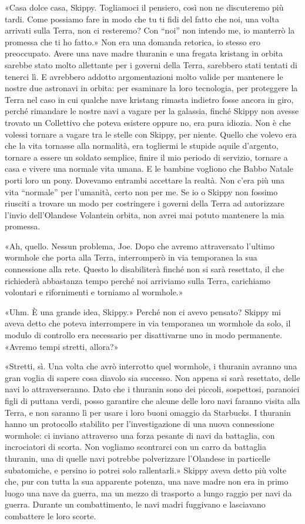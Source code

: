 «Casa dolce casa, Skippy. Togliamoci il pensiero, così non ne
discuteremo più tardi. Come possiamo fare in modo che tu ti fidi del
fatto che noi, una volta arrivati sulla Terra, non ci resteremo? Con
``noi'' non intendo me, io manterrò la promessa che ti ho fatto.» Non
era una domanda retorica, io stesso ero preoccupato. Avere una nave
madre thuranin e una fregata kristang in orbita sarebbe stato molto
allettante per i governi della Terra, sarebbero stati tentati di tenerci
lì. E avrebbero addotto argomentazioni molto valide per mantenere le
nostre due astronavi in orbita: per esaminare la loro tecnologia, per
proteggere la Terra nel caso in cui qualche nave kristang rimasta
indietro fosse ancora in giro, perché rimandare le nostre navi a vagare
per la galassia, finché Skippy non avesse trovato un Collettivo che
poteva esistere oppure no, era pura idiozia. Non è che volessi tornare a
vagare tra le stelle con Skippy, per niente. Quello che volevo era che
la vita tornasse alla normalità, era togliermi le stupide aquile
d'argento, tornare a essere un soldato semplice, finire il mio periodo
di servizio, tornare a casa e vivere una normale vita umana. E le
bambine vogliono che Babbo Natale porti loro un pony. Dovevamo entrambi
accettare la realtà. Non c'era più una vita ``normale'' per l'umanità,
certo non per me. Se io o Skippy non fossimo riusciti a trovare un modo
per costringere i governi della Terra ad autorizzare l'invio
dell'Olandese Volantein orbita, non avrei mai potuto mantenere la mia
promessa.

«Ah, quello. Nessun problema, Joe. Dopo che avremo attraversato l'ultimo
wormhole che porta alla Terra, interromperò in via temporanea la sua
connessione alla rete. Questo lo disabiliterà finché non si sarà
resettato, il che richiederà abbastanza tempo perché noi arriviamo sulla
Terra, carichiamo volontari e rifornimenti e torniamo al wormhole.»

«Uhm. È una grande idea, Skippy.» Perché non ci avevo pensato? Skippy mi
aveva detto che poteva interrompere in via temporanea un wormhole da
solo, il modulo di controllo era necessario per disattivarne uno in modo
permanente. «Avremo tempi stretti, allora?»

«Stretti, sì. Una volta che avrò interrotto quel wormhole, i thuranin
avranno una gran voglia di sapere cosa diavolo sia successo. Non appena
si sarà resettato, delle navi lo attraverseranno. Dato che i thuranin
sono dei piccoli, sospettosi, paranoici figli di puttana verdi, posso
garantire che alcune delle loro navi faranno visita alla Terra, e non
saranno lì per usare i loro buoni omaggio da Starbucks. I thuranin hanno
un protocollo stabilito per l'investigazione di una nuova connessione
wormhole: ci inviano attraverso una forza pesante di navi da battaglia,
con incrociatori di scorta. Non vogliamo scontrarci con un carro da
battaglia thuranin, una di quelle navi potrebbe polverizzare l'Olandese
in particelle subatomiche, e persino io potrei solo rallentarli.» Skippy
aveva detto più volte che, pur con tutta la sua apparente potenza, una
nave madre non era in primo luogo una nave da guerra, ma un mezzo di
trasporto a lungo raggio per navi da guerra. Durante un combattimento,
le navi madri fuggivano e lasciavano combattere le loro scorte.

